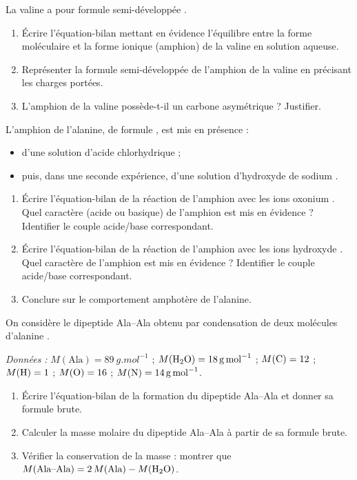 \documentclass[11pt]{article}
\begin{document}
\begin{exercice}
La valine a pour formule semi-développée .
\begin{enumerate}
\item Écrire l'équation-bilan mettant en évidence l'équilibre entre la forme moléculaire et la forme ionique (amphion) de la valine en solution aqueuse.
\item Représenter la formule semi-développée de l'amphion de la valine en précisant les charges portées.
\item L'amphion de la valine possède-t-il un carbone asymétrique ? Justifier.
\end{enumerate}
\end{exercice}

\begin{exercice}
L'amphion de l'alanine, de formule , est mis en présence :
\begin{itemize}
\item d'une solution d'acide chlorhydrique  ;
\item puis, dans une seconde expérience, d'une solution d'hydroxyde de sodium .
\end{itemize}
\begin{enumerate}
\item Écrire l'équation-bilan de la réaction de l'amphion avec les ions oxonium . Quel caractère (acide ou basique) de l'amphion est mis en évidence ? Identifier le couple acide/base correspondant.
\item Écrire l'équation-bilan de la réaction de l'amphion avec les ions hydroxyde . Quel caractère de l'amphion est mis en évidence ? Identifier le couple acide/base correspondant.
\item Conclure sur le comportement amphotère de l'alanine.
\end{enumerate}
\end{exercice}

\begin{exercice}
On considère le dipeptide Ala--Ala obtenu par condensation de deux molécules d'alanine .

\emph{Données :} $M(\text{Ala}) = \SI{89}{g.mol^{-1}}$ ; $M(\ce{H2O}) = \SI{18}{g.mol^{-1}}$ ; $M(\ce{C}) = 12$ ; $M(\ce{H}) = 1$ ; $M(\ce{O}) = 16$ ; $M(\ce{N}) = \SI{14}{g.mol^{-1}}$.
\begin{enumerate}
\item Écrire l'équation-bilan de la formation du dipeptide Ala--Ala et donner sa formule brute.
\item Calculer la masse molaire du dipeptide Ala--Ala à partir de sa formule brute.
\item Vérifier la conservation de la masse : montrer que $M(\text{Ala--Ala}) = 2\,M(\text{Ala}) - M(\ce{H2O})$.
\end{enumerate}
\end{exercice}
\end{document}
